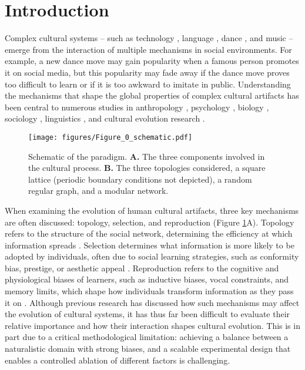 \documentclass[10pt,letterpaper]{article}
\begin{document}
\section{Introduction}
Complex cultural systems -- such as technology \cite{derex2015foundations, thompson2022complex}, language \cite{kirby2008cumulative, raviv2019larger}, dance \cite{laland2016evolution}, and music \cite{anglada2023large, ravignani2016musical} -- emerge from the interaction of multiple mechanisms in social environments. For example, a new dance move may gain popularity when a famous person promotes it on social media, but this popularity may fade away if the dance move proves too difficult to learn or if it is too awkward to imitate in public. 
Understanding the mechanisms that shape the global properties of complex cultural artifacts has been central to numerous studies in anthropology \cite{henrich2016secret}, psychology \cite{tomasello2009cultural}, biology \cite{whiten2019cultural}, sociology \cite{salganik2006experimental}, linguistics \cite{gray2003language, kirby2008cumulative}, and cultural evolution research \cite{mesoudi2011cultural}.
\begin{figure}[htp]
\begin{center}
\texttt{[image: figures/Figure\_0\_schematic.pdf]}
\end{center}
\vspace{-2mm}
\caption{Schematic of the paradigm. \textbf{A.} The three components involved in the cultural process. \textbf{B.} The three topologies considered, a square lattice (periodic boundary conditions not depicted), a random regular graph, and a modular network.} 
\label{fig:schematic-mechanism}
\end{figure}

When examining the evolution of human cultural artifacts, three key mechanisms are often discussed: topology, selection, and reproduction (Figure \ref{fig:schematic-mechanism}A). Topology refers to the structure of the social network, determining the efficiency at which information spreads \cite{centola2022network}. Selection determines what information is more likely to be adopted by individuals, often due to social learning strategies, such as conformity bias, prestige, or aesthetic appeal \cite{kendal2018social}. Reproduction refers to the cognitive and physiological biases of learners, such as inductive biases, vocal constraints, and memory limits, which shape how individuals transform information as they pass it on \cite{xu2010rational,anglada2023large}. Although previous research has discussed how such mechanisms may affect the evolution of cultural systems, it has thus far been difficult to evaluate their relative importance and how their interaction shapes cultural evolution. This is in part due to a critical methodological limitation: achieving a balance between a naturalistic domain with strong biases, and a scalable experimental design that enables a controlled ablation of different factors is challenging.
\end{document}
